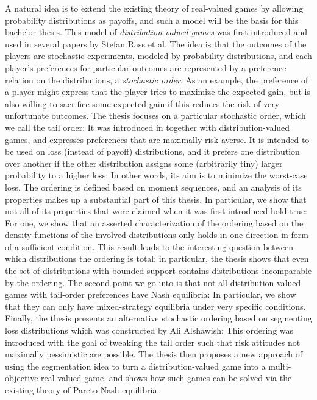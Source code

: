 \documentclass[a4paper]{scrreprt}
\theoremstyle{definition}
\begin{document}
    A natural idea is to extend the existing theory of real-valued games by allowing probability distributions as payoffs, and such a model will be the basis for this bachelor thesis. This model of \emph{distribution-valued games} was first introduced and used in several papers by Stefan Rass et al. The idea is that the outcomes of the players are stochastic experiments, modeled by probability distributions, and each player’s preferences for particular outcomes are represented by a preference relation on the distributions, a \emph{stochastic order}. As an example, the preference of a player might express that the player tries to maximize the expected gain, but is also willing to sacrifice some expected gain if this reduces the risk of very unfortunate outcomes.
    The thesis focuses on a particular stochastic order, which we call the tail order: It was introduced in \cite{bib:rassGameRiskManagI} together with distribution-valued games, and expresses preferences that are maximally risk-averse. It is intended to be used on loss (instead of payoff) distributions, and it prefers one distribution over another if the other distribution assigns some (arbitrarily tiny) larger probability to a higher loss: In other words, its aim is to minimize the worst-case loss. 
    The ordering is defined based on moment sequences, and an analysis of its properties makes up a substantial part of this thesis. In particular, we show that not all of its properties that were claimed when it was first introduced hold true: For one, we show that an asserted characterization of the ordering based on the density functions of the involved distributions only holds in one direction in form of a sufficient condition. This result leads to the interesting question between which distributions the ordering is total: in particular, the thesis shows that even the set of distributions with bounded support contains distributions incomparable by the ordering. The second point we go into is that not all distribution-valued games with tail-order preferences have Nash equilibria: In particular, we show that they can only have mixed-strategy equilibria under very specific conditions.
    Finally, the thesis presents an alternative stochastic ordering based on segmenting loss distributions which was constructed by Ali Alshawish: This ordering was introduced with the goal of tweaking the tail order such that risk attitudes not maximally pessimistic are possible. The thesis then proposes a new approach of using the segmentation idea to turn a distribution-valued game into a multi-objective real-valued game, and shows how such games can be solved via the existing theory of Pareto-Nash equilibria.
    
\end{document}
